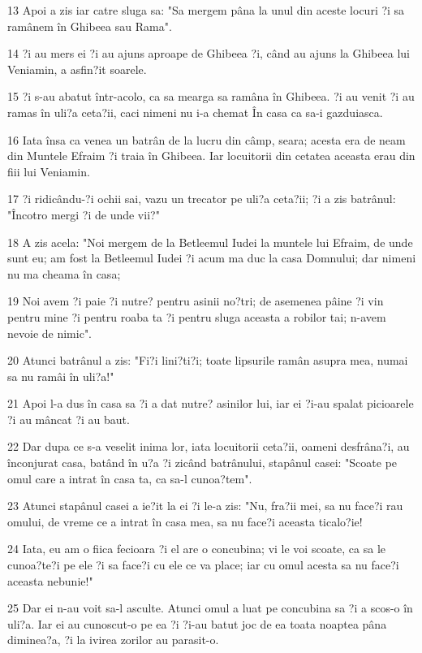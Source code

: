 \par 13 Apoi a zis iar catre sluga sa: "Sa mergem pâna la unul din aceste locuri ?i sa ramânem în Ghibeea sau Rama".
\par 14 ?i au mers ei ?i au ajuns aproape de Ghibeea ?i, când au ajuns la Ghibeea lui Veniamin, a asfin?it soarele.
\par 15 ?i s-au abatut într-acolo, ca sa mearga sa ramâna în Ghibeea. ?i au venit ?i au ramas în uli?a ceta?ii, caci nimeni nu i-a chemat În casa ca sa-i gazduiasca.
\par 16 Iata însa ca venea un batrân de la lucru din câmp, seara; acesta era de neam din Muntele Efraim ?i traia în Ghibeea. Iar locuitorii din cetatea aceasta erau din fiii lui Veniamin.
\par 17 ?i ridicându-?i ochii sai, vazu un trecator pe uli?a ceta?ii; ?i a zis batrânul: "Încotro mergi ?i de unde vii?"
\par 18 A zis acela: "Noi mergem de la Betleemul Iudei la muntele lui Efraim, de unde sunt eu; am fost la Betleemul Iudei ?i acum ma duc la casa Domnului; dar nimeni nu ma cheama în casa;
\par 19 Noi avem ?i paie ?i nutre? pentru asinii no?tri; de asemenea pâine ?i vin pentru mine ?i pentru roaba ta ?i pentru sluga aceasta a robilor tai; n-avem nevoie de nimic".
\par 20 Atunci batrânul a zis: "Fi?i lini?ti?i; toate lipsurile ramân asupra mea, numai sa nu ramâi în uli?a!"
\par 21 Apoi l-a dus în casa sa ?i a dat nutre? asinilor lui, iar ei ?i-au spalat picioarele ?i au mâncat ?i au baut.
\par 22 Dar dupa ce s-a veselit inima lor, iata locuitorii ceta?ii, oameni desfrâna?i, au înconjurat casa, batând în u?a ?i zicând batrânului, stapânul casei: "Scoate pe omul care a intrat în casa ta, ca sa-l cunoa?tem".
\par 23 Atunci stapânul casei a ie?it la ei ?i le-a zis: "Nu, fra?ii mei, sa nu face?i rau omului, de vreme ce a intrat în casa mea, sa nu face?i aceasta ticalo?ie!
\par 24 Iata, eu am o fiica fecioara ?i el are o concubina; vi le voi scoate, ca sa le cunoa?te?i pe ele ?i sa face?i cu ele ce va place; iar cu omul acesta sa nu face?i aceasta nebunie!"
\par 25 Dar ei n-au voit sa-l asculte. Atunci omul a luat pe concubina sa ?i a scos-o în uli?a. Iar ei au cunoscut-o pe ea ?i ?i-au batut joc de ea toata noaptea pâna diminea?a, ?i la ivirea zorilor au parasit-o.
